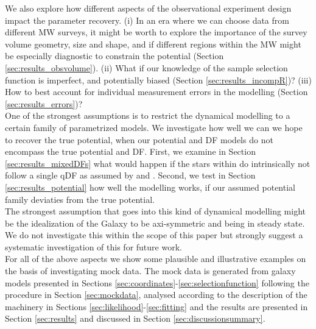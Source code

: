 We also explore how different aspects of the observational experiment design impact the parameter recovery. (i) In an era where we can choose data from different MW surveys, it might be worth to explore the importance of the survey volume geometry, size and shape, and if different regions within the MW might be especially diagnostic to constrain the potential (Section \ref{sec:results_obsvolume}). (ii) What if our knowledge of the sample selection function is imperfect, and potentially biased (Section \ref{sec:results_incompR})? (iii) How to best account for individual measurement errors in the modelling (Section \ref{sec:results_errors})? \\

One of the strongest assumptions is to restrict the dynamical modelling to a certain family of parametrized models. We investigate how well we can we hope to recover the true potential, when our potential and DF models do not encompass the true potential and DF. First, we examine in Section \ref{sec:results_mixedDFs} what would happen if the stars within \MAPs{} do intrinsically not follow a single qDF as assumed by \citet{2013MNRAS.434..652T} and \citet{2013ApJ...779..115B}. Second, we test in Section \ref{sec:results_potential} how well the modelling works, if our assumed potential family deviaties from the true potential.\\

The strongest assumption that goes into this kind of dynamical modelling might be the idealization of the Galaxy to be axi-symmetric and being in steady state. We do not investigate this within the scope of this paper but strongly suggest a systematic investigation of this for future work.\\

For all of the above aspects we show some plausible and illustrative examples on the basis of investigating mock data. The mock data is generated from galaxy models presented in Sections \ref{sec:coordinates}-\ref{sec:selectionfunction} following the procedure in Section \ref{sec:mockdata}, analysed according to the description of the \RM{} machinery in Sections \ref{sec:likelihood}-\ref{sec:fitting} and the results are presented in Section \ref{sec:results} and discussed in Section \ref{sec:discussionsummary}.

\\
\\
